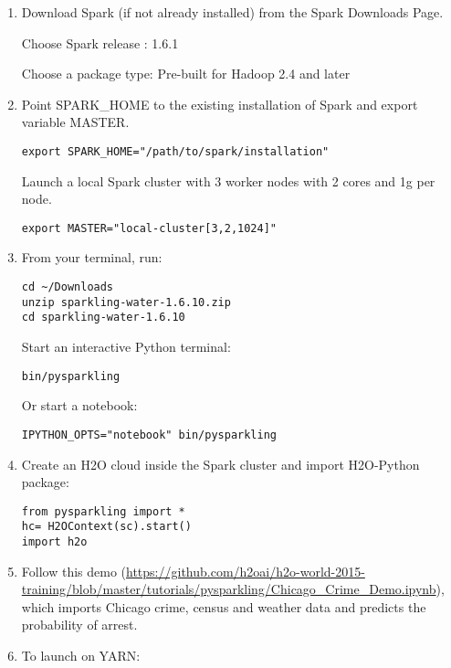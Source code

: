 \begin{enumerate}
\item Download Spark (if not already installed) from the Spark Downloads Page.

Choose Spark release : 1.6.1

Choose a package type: Pre-built for Hadoop 2.4 and later

\item Point SPARK\_HOME to the existing installation of Spark and export variable MASTER.

\begin{lstlisting}[style=Bash]
export SPARK_HOME="/path/to/spark/installation" 
\end{lstlisting}

Launch a local Spark cluster with 3 worker nodes with 2 cores and 1g per node.
\begin{lstlisting}[style=Bash]
export MASTER="local-cluster[3,2,1024]" 
\end{lstlisting}

\item From your terminal, run:

\begin{lstlisting}[style=Bash]
cd ~/Downloads
unzip sparkling-water-1.6.10.zip
cd sparkling-water-1.6.10
\end{lstlisting}

Start an interactive Python terminal:
\begin{lstlisting}[style=Bash]
bin/pysparkling
\end{lstlisting}

Or start a notebook:
\begin{lstlisting}[style=Bash]
IPYTHON_OPTS="notebook" bin/pysparkling
\end{lstlisting}

\item Create an H2O cloud inside the Spark cluster and import H2O-Python package:

\begin{lstlisting}[style=Scala]
from pysparkling import *
hc= H2OContext(sc).start()
import h2o
\end{lstlisting}

\item Follow this demo (\url{https://github.com/h2oai/h2o-world-2015-training/blob/master/tutorials/pysparkling/Chicago_Crime_Demo.ipynb}), which imports Chicago crime, census and weather data and predicts the probability of arrest.


\item To launch on YARN:


\end{enumerate}
